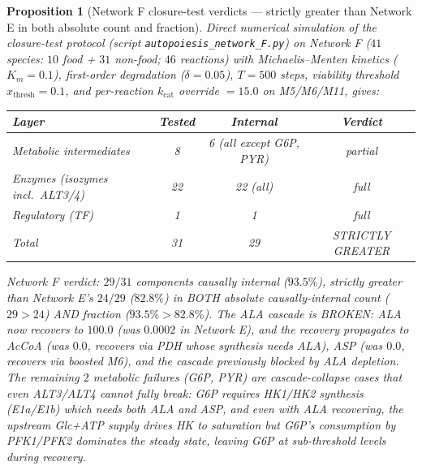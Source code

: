 \documentclass[11pt,a4paper]{article}
\theoremstyle{plain}
\newtheorem{proposition}[theorem]{Proposition}
\theoremstyle{definition}
\theoremstyle{remark}
\begin{document}
\begin{proposition}[Network F closure-test verdicts --- strictly
greater than Network E in both absolute count and fraction]
\label{prop:netF-verdict}
Direct numerical simulation of the closure-test protocol
(script \texttt{autopoiesis\_network\_F.py}) on Network F
($41$ species: $10$ food + $31$ non-food; $46$ reactions) with
Michaelis--Menten kinetics ($K_m = 0.1$), first-order degradation
($\delta = 0.05$), $T = 500$ steps, viability threshold
$x_{\mathrm{thresh}} = 0.1$, and per-reaction $k_{\mathrm{cat}}$
override $= 15.0$ on M5/M6/M11, gives:
\begin{center}\footnotesize
\begin{tabular}{lccc}
\toprule
Layer & Tested & Internal & Verdict \\
\midrule
Metabolic intermediates & 8 & 6 (all except G6P, PYR) & partial \\
Enzymes (isozymes incl.~ALT3/4) & 22 & 22 (all) & full \\
Regulatory (TF) & 1 & 1 & full \\
\midrule
Total & 31 & 29 & STRICTLY GREATER \\
\bottomrule
\end{tabular}
\end{center}
Network F verdict: $29/31$ components causally internal ($93.5\%$),
strictly greater than Network E's $24/29$ ($82.8\%$) in BOTH absolute
causally-internal count ($29 > 24$) AND fraction ($93.5\% > 82.8\%$).
The ALA cascade is BROKEN: ALA now recovers to $100.0$ (was $0.0002$
in Network E), and the recovery propagates to AcCoA (was $0.0$,
recovers via PDH whose synthesis needs ALA), ASP (was $0.0$, recovers
via boosted M6), and the cascade previously blocked by ALA depletion.
The remaining $2$ metabolic failures (G6P, PYR) are cascade-collapse
cases that even ALT3/ALT4 cannot fully break: G6P requires HK1/HK2
synthesis (E1a/E1b) which needs both ALA and ASP, and even with ALA
recovering, the upstream Glc+ATP supply drives HK to saturation but
G6P's consumption by PFK1/PFK2 dominates the steady state, leaving G6P
at sub-threshold levels during recovery.
\end{proposition}
\end{document}
